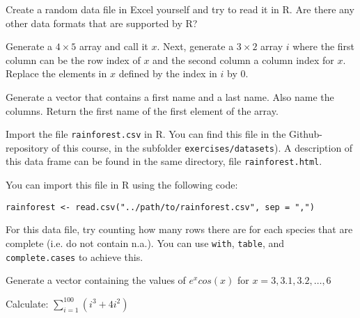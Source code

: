 \begin{exercise}
    Create a random data file in Excel yourself and try to read it in R. 
    Are there any other data formats that are supported by R?
\end{exercise}

\begin{exercise}
    Generate a $4 \times 5$ array and call it $x$. 
    Next, generate a $3 \times 2$ array $i$ where the first column can be the row index of $x$
    and the second column a column index for $x$. 
    Replace the elements in $x$ defined by the index in $i$ by 0. 
\end{exercise}

\begin{exercise}
    Generate a vector that contains a first name and a last name. Also name the columns. Return the first name of the first element of the array.
\end{exercise}

\begin{exercise}
    Import the file \texttt{rainforest.csv} in R.
    You can find this file in the Github-repository of this course, in the subfolder \texttt{exercises/datasets}). 
    A description of this data frame can be found in the same directory, file \texttt{rainforest.html}.

    You can import this file in R using the following code:
    \begin{lstlisting}
rainforest <- read.csv("../path/to/rainforest.csv", sep = ",")
    \end{lstlisting}

    For this data file, try counting how many rows there are for each species that are complete (i.e. do not contain n.a.). 
    You can use \texttt{with}, \texttt{table}, and \texttt{complete.cases} to achieve this.
\end{exercise}

\begin{exercise}
    Generate a vector containing the values of $e^x cos(x)$ for $x= 3, 3.1, 3.2, \dots ,6$
\end{exercise}

\begin{exercise}
    Calculate: $\sum_{i=1}^{100}(i^3 + 4i^2)$
\end{exercise}

